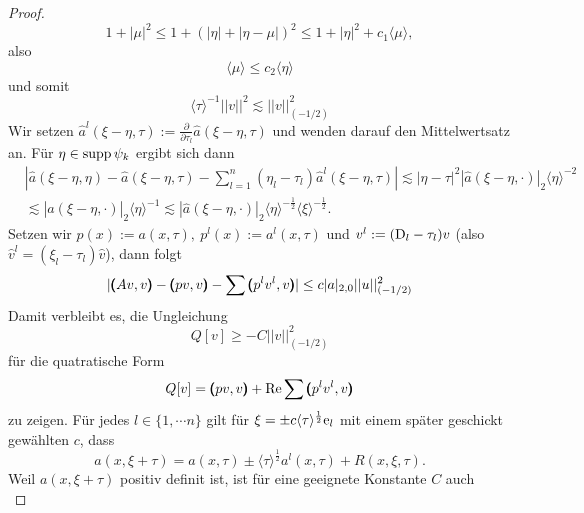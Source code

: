 \begin{proof}
\begin{equation}
	1+|\mu|^2 \le 1+\left(| \eta|+| \eta-\mu|\right)^2 \le 1+|\eta|^2+ c_1 \langle \mu \rangle,
\end{equation}
also
\begin{equation}
	\langle \mu\rangle \le c_2\langle \eta\rangle
\end{equation}
und somit
\begin{equation}\label{Abschaetzung 0-Norm}
	\langle \tau\rangle^{-1}|| v||^2 \lesssim|| v||_{\left(-{1}/{2}\right)}^2
\end{equation}
Wir setzen $\widehat{a}^l(\xi-\eta,\tau):=\frac{\partial}{\partial \tau_l}\widehat{a}(\xi-\eta,\tau)$ und wenden darauf den Mittelwertsatz an. Für $\eta\in \operatorname{supp} \psi_k$ ergibt sich dann
\begin{equation}
\begin{split}	&| \widehat{a}(\xi-\eta,\eta)-\widehat{a}(\xi-\eta,\tau) -\sum\limits_{l=1}^n (\eta_l-\tau_l)\widehat{a}^l\left(\xi-\eta,\tau\right)| \lesssim| \eta-\tau|^2| \widehat{a}(\xi-\eta,\cdot)|_2\langle\eta\rangle^{-2} \\&
\lesssim | \widehat{a}(\xi-\eta,\cdot)|_2 \langle\eta\rangle^{-1} \lesssim| \widehat{a}(\xi-\eta,\cdot)|_2\langle\eta\rangle^{-\frac{1}{2}}\langle\xi\rangle^{-\frac{1}{2}}.
\end{split}
\end{equation}
Setzen wir $p(x):=a(x,\tau),\ p^l(x):= a^l(x,\tau) $ und $v^l:=(\mathrm D_l-\tau_l)v$ (also $\widehat{v}^l=\left(\xi_l-\tau_l\right)\widehat{v}$), dann folgt
\begin{equation}
	|\pmb(Av,v\pmb)-\pmb(pv,v\pmb)-\sum\pmb(p^lv^l,v\pmb)| \le c | a|_{2,0}|| u||_{\left(-{1}/{2}\right)}^2
\end{equation}
Damit verbleibt es, die Ungleichung \begin{equation}
	Q[v] \ge -C|| v||_{\left(-{1}/{2}\right)}^2
\end{equation}
für die quatratische Form
\begin{equation}
	Q[v]=\pmb(pv,v\pmb)+\operatorname{Re}\sum\pmb(p^lv^l,v\pmb) 
\end{equation}
zu zeigen. Für jedes $l\in\{1,\cdots n\}$ gilt für $\xi = \pm c\langle\tau\rangle^{\frac{1}{2}}\mathrm e_l$ mit einem später geschickt gewählten $c$, dass
\begin{equation}
	a(x,\xi+\tau) = a(x,\tau)\pm\langle\tau\rangle^{\frac{1}{2}}a^l(x,\tau) + R(x,\xi,\tau). 
\end{equation}
Weil $a(x,\xi+\tau)$ positiv definit ist, ist für eine geeignete Konstante $C$ auch
\begin{equation}

\end{equation}
\end{proof}
